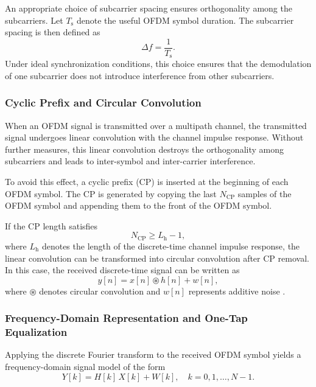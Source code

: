 An appropriate choice of subcarrier spacing ensures orthogonality among the subcarriers. Let $T_{\mathrm{s}}$ denote the useful OFDM symbol duration. The subcarrier spacing is then defined as
\begin{equation}
\Delta f = \frac{1}{T_{\mathrm{s}}}.
\end{equation}
Under ideal synchronization conditions, this choice ensures that the demodulation of one subcarrier does not introduce interference from other subcarriers.

\subsubsection{Cyclic Prefix and Circular Convolution}

When an OFDM signal is transmitted over a multipath channel, the transmitted signal undergoes linear convolution with the channel impulse response. Without further measures, this linear convolution destroys the orthogonality among subcarriers and leads to inter-symbol and inter-carrier interference.

To avoid this effect, a cyclic prefix (CP) is inserted at the beginning of each OFDM symbol. The CP is generated by copying the last $N_{\mathrm{CP}}$ samples of the OFDM symbol and appending them to the front of the OFDM symbol.

If the CP length satisfies
\begin{equation}
N_{\mathrm{CP}} \geq L_{\mathrm{h}} - 1,
\end{equation}
where $L_{\mathrm{h}}$ denotes the length of the discrete-time channel impulse response, the linear convolution can be transformed into circular convolution after CP removal. In this case, the received discrete-time signal can be written as
\begin{equation}
y[n] = x[n] \circledast h[n] + w[n],
\end{equation}
where $\circledast$ denotes circular convolution and $w[n]$ represents additive noise \cite{proakis2008digital}.

\subsubsection{Frequency-Domain Representation and One-Tap Equalization}

Applying the discrete Fourier transform to the received OFDM symbol yields a frequency-domain signal model of the form
\begin{equation}
Y[k] = H[k]\,X[k] + W[k], 
\quad k = 0,1,\dots,N-1.
\end{equation}


